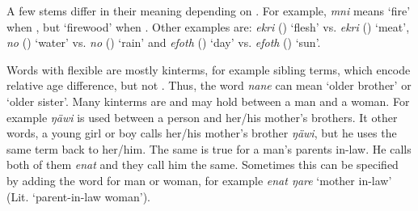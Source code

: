 A few stems differ in their meaning depending on . For example, \emph{mni} means `fire' when , but `firewood' when . Other examples are: \emph{ekri} (\F) `flesh' vs. \emph{ekri} (\Masc) `meat', \emph{no} (\F) `water' vs. \emph{no}  (\Masc) `rain' and \emph{efoth} (\F) `day' vs. \emph{efoth} (\Masc) `sun'.%

Words with flexible  are mostly kinterms, for example sibling terms, which encode relative age difference, but not . Thus, the word \emph{nane} can mean `older brother' or `older sister'. Many kinterms are  and may hold between a man and a woman. For example \emph{ŋäwi} is used between a person and her/his mother's brothers. It other words, a young girl or boy calls her/his mother's brother \emph{ŋäwi}, but he uses the same term back to her/him. The same is true for a man's parents in-law. He calls both of them \emph{enat} and they call him the same. Sometimes this can be specified by adding the word for man or woman, for example \emph{enat ŋare} `mother in-law' (Lit. `parent-in-law woman').



